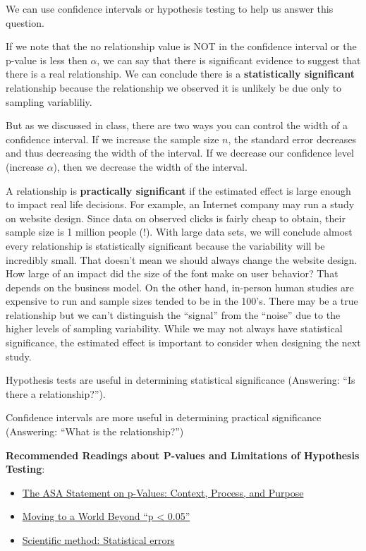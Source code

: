 \documentclass[
]{book}
\providecommand{\tightlist}{%
  \setlength{\itemsep}{0pt}\setlength{\parskip}{0pt}}
\begin{document}
We can use confidence intervals or hypothesis testing to help us answer this question.

If we note that the no relationship value is NOT in the confidence interval or the p-value is less then \(\alpha\), we can say that there is significant evidence to suggest that there is a real relationship. We can conclude there is a \textbf{statistically significant} relationship because the relationship we observed it is unlikely be due only to sampling variabliliy.

But as we discussed in class, there are two ways you can control the width of a confidence interval. If we increase the sample size \(n\), the standard error decreases and thus decreasing the width of the interval. If we decrease our confidence level (increase \(\alpha\)), then we decrease the width of the interval.

A relationship is \textbf{practically significant} if the estimated effect is large enough to impact real life decisions. For example, an Internet company may run a study on website design. Since data on observed clicks is fairly cheap to obtain, their sample size is 1 million people (!). With large data sets, we will conclude almost every relationship is statistically significant because the variability will be incredibly small. That doesn't mean we should always change the website design. How large of an impact did the size of the font make on user behavior? That depends on the business model. On the other hand, in-person human studies are expensive to run and sample sizes tended to be in the 100's. There may be a true relationship but we can't distinguish the ``signal'' from the ``noise'' due to the higher levels of sampling variability. While we may not always have statistical significance, the estimated effect is important to consider when designing the next study.

Hypothesis tests are useful in determining statistical significance (Answering: ``Is there a relationship?'').

Confidence intervals are more useful in determining practical significance (Answering: ``What is the relationship?'')

\textbf{Recommended Readings about P-values and Limitations of Hypothesis Testing}:

\begin{itemize}
\tightlist
\item
  \href{https://www.tandfonline.com/doi/full/10.1080/00031305.2016.1154108}{The ASA Statement on p-Values: Context, Process, and Purpose}
\item
  \href{https://www.tandfonline.com/doi/full/10.1080/00031305.2019.1583913}{Moving to a World Beyond ``p \textless{} 0.05''}
\item
  \href{https://www.nature.com/news/scientific-method-statistical-errors-1.14700}{Scientific method: Statistical errors}
\end{itemize}
\end{document}
